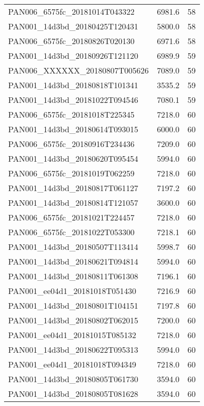 \begin{tabular}{lrr}
PAN006\_6575fc\_20181014T043322 &     6981.6 &       58 \\
PAN001\_14d3bd\_20180425T120431 &     5800.0 &       58 \\
PAN006\_6575fc\_20180826T020130 &     6971.6 &       58 \\
PAN001\_14d3bd\_20180926T121120 &     6989.9 &       59 \\
PAN006\_XXXXXX\_20180807T005626 &     7089.0 &       59 \\
PAN001\_14d3bd\_20180818T101341 &     3535.2 &       59 \\
PAN001\_14d3bd\_20181022T094546 &     7080.1 &       59 \\
PAN006\_6575fc\_20181018T225345 &     7218.0 &       60 \\
PAN001\_14d3bd\_20180614T093015 &     6000.0 &       60 \\
PAN006\_6575fc\_20180916T234436 &     7209.0 &       60 \\
PAN001\_14d3bd\_20180620T095454 &     5994.0 &       60 \\
PAN006\_6575fc\_20181019T062259 &     7218.0 &       60 \\
PAN001\_14d3bd\_20180817T061127 &     7197.2 &       60 \\
PAN001\_14d3bd\_20180814T121057 &     3600.0 &       60 \\
PAN006\_6575fc\_20181021T224457 &     7218.0 &       60 \\
PAN006\_6575fc\_20181022T053300 &     7218.1 &       60 \\
PAN001\_14d3bd\_20180507T113414 &     5998.7 &       60 \\
PAN001\_14d3bd\_20180621T094814 &     5994.0 &       60 \\
PAN001\_14d3bd\_20180811T061308 &     7196.1 &       60 \\
PAN001\_ee04d1\_20181018T051430 &     7216.9 &       60 \\
PAN001\_14d3bd\_20180801T104151 &     7197.8 &       60 \\
PAN001\_14d3bd\_20180802T062015 &     7200.0 &       60 \\
PAN001\_ee04d1\_20181015T085132 &     7218.0 &       60 \\
PAN001\_14d3bd\_20180622T095313 &     5994.0 &       60 \\
PAN001\_ee04d1\_20181018T094349 &     7218.0 &       60 \\
PAN001\_14d3bd\_20180805T061730 &     3594.0 &       60 \\
PAN001\_14d3bd\_20180805T081628 &     3594.0 &       60 \\

\end{tabular}
